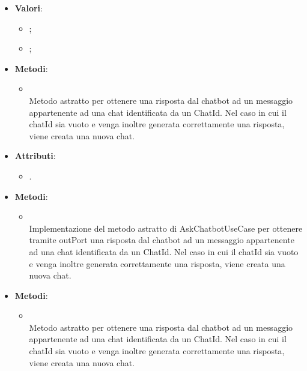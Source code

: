 \documentclass[10pt, a4paper]{article}
\begin{document}
\label{MessageSenderDettaglio}
\begin{itemize}
    \item \textbf{Valori}:
    \begin{itemize}
        \item {};
        \item {};
    \end{itemize}
\end{itemize}

\label{AskChatbotUseCaseDettaglio}
\begin{itemize}
    \item \textbf{Metodi}:
    \begin{itemize}
        \item {}\\
        Metodo astratto per ottenere una risposta dal chatbot ad un messaggio appartenente ad una chat identificata da un ChatId. Nel caso in cui il chatId sia vuoto e venga inoltre generata correttamente una risposta, viene creata una nuova chat.
    \end{itemize}
\end{itemize}

\label{AskChatbotServiceDettaglio}
\begin{itemize}
    \item \textbf{Attributi}:
    \begin{itemize}
        \item {}.
    \end{itemize}
    \item \textbf{Metodi}:
    \begin{itemize}
        \item {}\\
        Implementazione del metodo astratto di AskChatbotUseCase per ottenere tramite outPort una risposta dal chatbot ad un messaggio appartenente ad una chat identificata da un ChatId. Nel caso in cui il chatId sia vuoto e venga inoltre generata correttamente una risposta, viene creata una nuova chat.
    \end{itemize}
\end{itemize}

\label{AskChatbotPortDettaglio}
\begin{itemize}
    \item \textbf{Metodi}:
    \begin{itemize}
        \item {}\\
        Metodo astratto per ottenere una risposta dal chatbot ad un messaggio appartenente ad una chat identificata da un ChatId. Nel caso in cui il chatId sia vuoto e venga inoltre generata correttamente una risposta, viene creata una nuova chat.
    \end{itemize}
\end{itemize}
\end{document}
